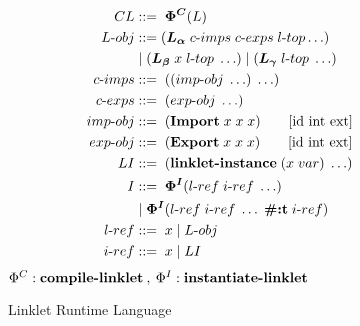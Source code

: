 \documentclass[sigplan,screen,anonymous]{acmart}
\def\dash {\text{-}}
\begin{document}
\def\la {\bm{L_\alpha}}
\def\lb {\bm{L_\beta}}
\def\lc {\bm{L_\gamma}}



\begin{figure}[tbp]
  \begin{align*}
    CL             &::=\; \bm{\Phi^C}(L)\\
    L\dash obj     &::= (\la\; c\dash imps \; c\dash exps \; l\dash top \ldots)\\
    \;           &\;|\; (\lb\; x\; l\dash top\; \ldots)\; |\; (\lc\; l\dash top\; \ldots) \\
    c\dash imps    &::=\; ((imp\dash obj\; \ldots)\; \ldots)\\
    c\dash exps    &::=\; (exp\dash obj\; \ldots)\\
    imp\dash obj   &::=\; (\textbf{Import}\; x\; x\; x) \tag*{[id int ext]} \\
    exp\dash obj   &::=\; (\textbf{Export}\; x\; x\; x) \tag*{[id int ext]} \\
    LI             &::=\; (\textbf{linklet\dash instance}\; (x\; var)\; \ldots) \\
    I              &::=\; \bm{\Phi^I}(l\dash ref\; i\dash ref\; \ldots) \\
    \;           &\;|\; \bm{\Phi^I}(l\dash ref\; i\dash ref\; \ldots\; \textbf{\#:t}\; i\dash ref) \\
    l\dash ref &::=\; x\; |\; L\dash obj \\
    i\dash ref  &::=\; x\; |\; LI \\
  \end{align*}
  \hfill \footnotesize $\Phi^C : \textbf{compile\dash linklet}\:,\: \Phi^I : \textbf{instantiate\dash linklet}$
\caption{Linklet Runtime Language}
\label{fig:linklet-runtime}
\end{figure}
\end{document}
